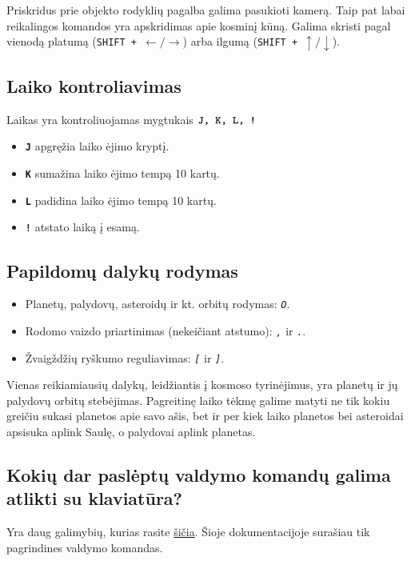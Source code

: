 \documentclass[a4paper]{article}
\begin{document}
Priskridus prie objekto rodyklių pagalba galima pasukioti kamerą. Taip pat labai reikalingos komandos yra apskridimas apie kosminį kūną. Galima skristi pagal vienodą platumą (\texttt{SHIFT + $\leftarrow / \rightarrow$}) arba ilgumą (\texttt{SHIFT + $\uparrow / \downarrow$}).

\subsection*{Laiko kontroliavimas}
 
Laikas yra kontroliuojamas mygtukais $\textbf{\texttt{J, K, L, !}}$

\begin{itemize}
\item \textbf{\texttt{J}} apgręžia laiko ėjimo kryptį.
\item \textbf{\texttt{K}} sumažina laiko ėjimo tempą 10 kartų.
\item \textbf{\texttt{L}} padidina laiko ėjimo tempą 10 kartų.
\item \textbf{\texttt{!}} atstato laiką į esamą.
\end{itemize}

\subsection*{Papildomų dalykų rodymas}
\begin{itemize}
\item Planetų, palydovų, asteroidų ir kt. orbitų rodymas: \texttt{\textit{O}}.
\item Rodomo vaizdo priartinimas (nekeičiant atstumo): \texttt{\textit{,}} ir \texttt{\textit{.}}.
\item Žvaigždžių ryškumo reguliavimas: \texttt{\textit{[}} ir \texttt{\textit{]}}.
\end{itemize}

Vienas reikiamiausių dalykų, leidžiantis į kosmoso tyrinėjimus, yra planetų ir jų palydovų orbitų stebėjimas. Pagreitinę laiko tėkmę galime matyti ne tik kokiu greičiu sukasi planetos apie savo ašis, bet ir per kiek laiko planetos bei asteroidai apsisuka aplink Saulę, o palydovai aplink planetas.

\subsection*{Kokių dar paslėptų valdymo komandų galima atlikti su klaviatūra?}

Yra daug galimybių, kurias rasite \href{http://www.teachingchallenges.com/2009/10/tech-tips-tuesday.html}{šičia}. Šioje dokumentacijoje surašiau tik pagrindines valdymo komandas.
\end{document}
